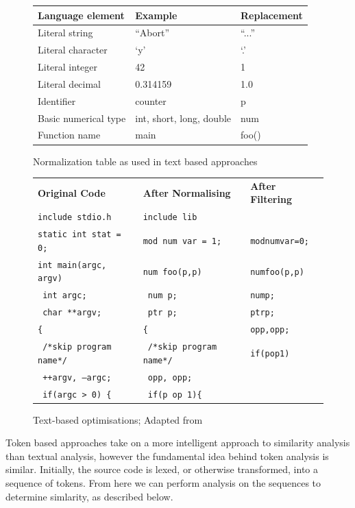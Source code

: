 \begin{figure}[p]
\label{tab:normalise}
\begin{tabular}{| l | l | l |}
\hline 
\textbf{Language element} & \textbf{Example} & \textbf{Replacement} \\
\hline \hline
Literal string & ``Abort'' & ``...'' \\
\hline
Literal character & `y' & `.' \\
\hline
Literal integer & 42 & 1 \\
\hline
Literal decimal & 0.314159 & 1.0 \\
\hline
Identifier & counter & p \\
\hline
Basic numerical type & int, short, long, double & num \\
\hline
Function name & main & foo() \\
\hline \hline
\end{tabular}
\caption{Normalization table as used in text based approaches\cite{DucasseText}}
\end{figure}
\begin{figure}[p]
\begin{tabular}{l l l}
\textbf{Original Code} & \textbf{After Normalising} & \textbf{After Filtering} \\
\texttt{include stdio.h} & \texttt{include lib} & \\
\texttt{static int stat = 0;} & \texttt{mod num var = 1;} & \texttt{modnumvar=0;}\\
\texttt{int main(argc, argv)} & \texttt{num foo(p,p)} & \texttt{numfoo(p,p)}\\
\texttt{  int argc;} & \texttt{  num p;} & \texttt{nump;}\\
\texttt{  char **argv;} & \texttt{  ptr p;} & \texttt{ptrp;}\\
\texttt{\{} & \texttt{\{} & \texttt{opp,opp;}\\
\texttt{  /*skip program name*/} & \texttt{  /*skip program name*/} & \texttt{if(pop1)}\\
\texttt{  ++argv, --argc;} & \texttt{  opp, opp;} & \\
\texttt{  if(argc > 0) \{} & \texttt{  if(p op 1)\{} & \\
\end{tabular}
\caption{Text-based optimisations; Adapted from\citep[p.~49]{CloneDetection}}
\label{code:optimisedText}
\end{figure}

Token based approaches take on a more intelligent approach to similarity analysis
than textual analysis, however the fundamental idea behind token analysis is similar.
Initially, the source code is lexed, or otherwise transformed, into a sequence of tokens.
From here we can perform analysis on the sequences to determine simlarity, as described
below.

